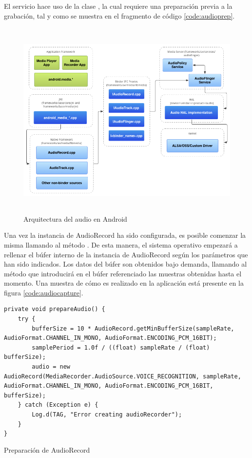 El servicio hace uso de la clase , la cual requiere una preparación previa a la grabación, tal y como se muestra en el fragmento de código \ref{code:audioprep}.


\begin{figure}[H] \centering
    \includegraphics[height=10cm]{graphs/audio_hal.png} \caption{Arquitectura del audio en Android  \cite{audiohal}}\label{fig:diagrama:audiohal}
\end{figure}

    Una vez la instancia de AudioRecord ha sido configurada, es posible comenzar la misma llamando al método . De esta manera, el sistema operativo empezará a rellenar el búfer interno de la instancia de AudioRecord según los parámetros que han sido indicados. Los datos del búfer son obtenidos bajo demanda, llamando al método  que introducirá en el búfer referenciado las muestras obtenidas hasta el momento. Una muestra de cómo es realizado en la aplicación está presente en la figura \ref{code:audiocapture}. 

\begin{listing}[H] 
\begin{verbatim}
private void prepareAudio() {
    try {
        bufferSize = 10 * AudioRecord.getMinBufferSize(sampleRate, AudioFormat.CHANNEL_IN_MONO, AudioFormat.ENCODING_PCM_16BIT);
        samplePeriod = 1.0f / ((float) sampleRate / (float) bufferSize);
        audio = new AudioRecord(MediaRecorder.AudioSource.VOICE_RECOGNITION, sampleRate, AudioFormat.CHANNEL_IN_MONO, AudioFormat.ENCODING_PCM_16BIT, bufferSize);
    } catch (Exception e) {
        Log.d(TAG, "Error creating audioRecorder");
    }
}
\end{verbatim}
\caption{Preparación de AudioRecord}
\label{code:audioprep}
\end{listing}
    
